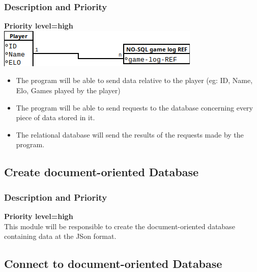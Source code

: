 \documentclass{scrreprt}
\begin{document}
\subsubsection{Description and Priority}
\textbf{Priority level=high}\\
\includegraphics[keepaspectratio]{SQL}
\begin{itemize}
\item The program will be able to send data relative to the player (eg: ID, Name, Elo, Games played by the player)
\item The program will be able to send requests to the database concerning every piece of data stored in it.
\item The relational database will send the results of the requests made by the program.
\end{itemize}


\subsection{Create document-oriented Database}

\subsubsection{Description and Priority}
\textbf{Priority level=high}\\
This module will be responsible to create the document-oriented database containing data at the JSon format.
\subsection{Connect to document-oriented Database}
\end{document}
